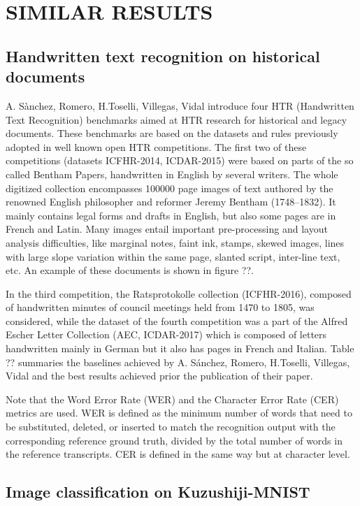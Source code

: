\section{\uppercase{Similar results}}
\label{sec:stateofart}

\subsection{Handwritten text recognition on historical documents}
\label{ssec:historicaldocuments}

A. Sànchez, Romero, H.Toselli, Villegas, Vidal  introduce four HTR (Handwritten Text Recognition) benchmarks aimed at HTR research for historical and legacy documents. These benchmarks are based on the datasets and rules previously adopted in well known open HTR competitions. The first two of these competitions (datasets ICFHR-2014, ICDAR-2015) were based on parts of the so called Bentham Papers, handwritten in English by several writers. The whole digitized collection encompasses 100000 page images of text authored by the renowned English philosopher and reformer Jeremy Bentham (1748–1832). It mainly contains legal forms and drafts in English, but also some pages are in French and Latin. Many images entail important pre-processing and layout analysis difficulties, like marginal notes, faint ink, stamps, skewed images, lines with large slope variation within the same page, slanted script, inter-line text, etc. An example of these documents is shown in figure ??.

In the third competition, the Ratsprotokolle collection (ICFHR-2016), composed of handwritten minutes of council meetings held from 1470 to 1805, was considered, while the dataset of the fourth competition was a part of the Alfred Escher Letter Collection (AEC, ICDAR-2017) which is composed of letters handwritten mainly in German but it also has pages in French and Italian. Table ?? summaries the baselines achieved by A. Sánchez, Romero, H.Toselli, Villegas, Vidal and the best results achieved prior the publication of their paper.

Note that the Word Error Rate (WER) and the Character Error Rate (CER) metrics are used. WER is defined as the minimum number of words that need to be substituted, deleted, or inserted to match the recognition output with the corresponding reference ground truth, divided by the total number of words in the reference transcripts. CER is defined in the same way but at character level.

\subsection{Image classification on Kuzushiji-MNIST}
\label{ssec:imagemnist}

